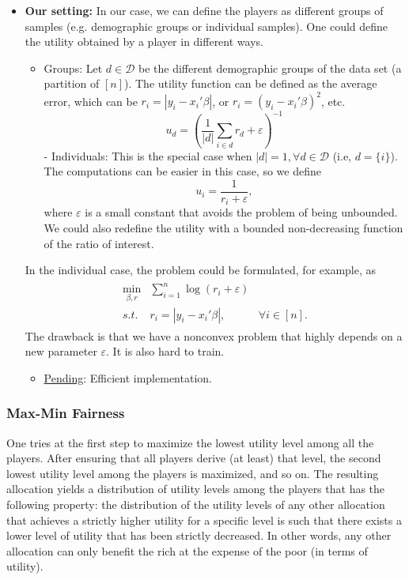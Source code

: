 \documentclass{article}
\newcommand{\D}{\mathcal{D}}
\begin{document}
\begin{itemize}
    \item \textbf{Our setting:} In our case, we can define the players as different groups of samples (e.g. demographic groups or individual samples). One could define the utility obtained by a player in different ways.
    \begin{itemize}
        \item Groups: Let $d \in \D$ be the different demographic groups of the data set (a partition of $[n]$). The utility function can be defined as the average error, which can be $r_i=|y_i - x_i'\beta|$, or $r_i=(y_i - x_i'\beta)^2$, etc.
        $$
            u_d = \left(\frac{1}{|d|}\sum_{i\in d} r_d + \varepsilon\right)^{-1}
        $$
        - Individuals: This is the special case when $|d|=1, \forall d \in \D$ (i.e, $d=\{i\}$). The computations can be easier in this case, so we define
        $$
            u_i =  \frac{1}{r_i + \varepsilon},
        $$
            where $\varepsilon$ is a small constant that avoids the problem of being unbounded. We could also redefine the utility with a bounded non-decreasing function of the ratio of interest.
    \end{itemize}
 

    In the individual case, the problem could be formulated, for example, as
    \begin{align*}
        \begin{array}{rcc}
           \min_{\beta,r}  & \sum_{i=1}^n\log(r_i + \varepsilon) \\
             s.t. & r_i = |y_i - x_i'\beta|, &  \forall i \in [n].
        \end{array}
    \end{align*}
    The drawback is that we have a nonconvex problem that highly depends on a new parameter $\varepsilon$. It is also hard to train.
    \begin{itemize}
        \item \underline{Pending}: Efficient implementation.
    \end{itemize}
\end{itemize}



\subsubsection{Max-Min Fairness}

One tries at the first step to maximize the lowest utility level among all the players. After ensuring that all players derive (at least) that level, the
second lowest utility level among the players is maximized, and so on. The resulting allocation yields a distribution of utility levels among the players that has the following property: the distribution of the utility levels of any other allocation that achieves a strictly higher utility for a specific
level is such that there exists a lower level of utility that has been strictly decreased. In other words, any other allocation can only benefit the rich at the expense of the poor (in terms of utility).
\end{document}

